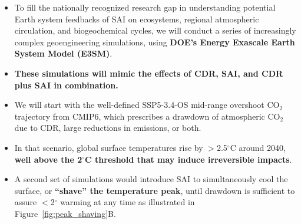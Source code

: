 \begin{itemize}
	\item To fill the nationally recognized research gap in understanding potential Earth system feedbacks of SAI on ecosystems, regional atmospheric circulation, and biogeochemical cycles, we will conduct a series of increasingly complex geoengineering simulations, using \textbf{DOE's Energy Exascale Earth System Model (E3SM)}.

	\item \textbf{These simulations will mimic the effects of CDR, SAI, and CDR plus SAI in combination.}

	\item We will start with the well-defined SSP5-3.4-OS mid-range overshoot CO$_2$ trajectory from CMIP6, which prescribes a drawdown of atmospheric CO$_2$ due to CDR, large reductions in emissions, or both.

	\item In that scenario, global surface temperatures rise by $>$2.5$^\circ$C around 2040, \textbf{well above the 2$^\circ$C threshold that may induce irreversible impacts}.

	\item A second set of simulations would introduce SAI to simultaneously cool the surface, or \textbf{``shave'' the temperature peak}, until drawdown is sufficient to assure $<$2$^\circ$ warming at any time as illustrated in Figure~\ref{fig:peak_shaving}B.
\end{itemize}

